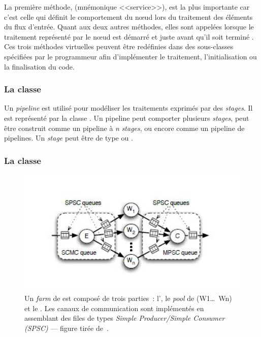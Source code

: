 La premi\`ere m\'ethode,  (mn\'emonique <<service>>), est la plus importante car c'est celle qui d\'efinit le comportement du nœud lors du traitement des \'el\'ements du flux d'entr\'ee. Quant aux deux autres m\'ethodes, elles sont appel\'ees lorsque le traitement repr\'esent\'e par le nœud est d\'emarr\'e  et juste avant qu'il soit termin\'e . Ces trois m\'ethodes virtuelles peuvent \^etre red\'efinies dans des sous-classes  sp\'ecifi\'ees par le programmeur afin d'impl\'ementer le traitement, l'initialisation ou la finalisation du code.


\subsubsection*{La classe }

Un \emph{pipeline} est utilis\'e pour mod\'eliser les traitements exprim\'es par des \emph{stages}. Il est repr\'esent\'e par la classe . Un {pipeline} peut comporter plusieurs \emph{stages}, peut \^etre construit comme un pipeline \`a \emph{n} \emph{stages}, ou encore comme un {pipeline} de {pipelines}. Un \emph{stage} peut \^etre de type  ou .


\goodbreak

\subsubsection*{La classe }
\label{farm.sect}

\begin{figure}[htbp]
     \centering
     \includegraphics[width=1.0\textwidth]{Figures/FastFlowFarm.jpg}
      \caption[Les trois parties d'un \emph{farm} de .]{Un \emph{farm} de  est compos\'e de trois parties~:  l', le \emph{pool} de  (W1\ldots\ Wn) et le . Les canaux de communication sont impl\'ement\'es en assemblant des files de types \emph{Simple Producer/Simple Consumer (SPSC)} --- figure tir\'ee de~\citep{aldinucci2010efficient}.}
       \label{FastFlowFarm.fig}
\end{figure}

